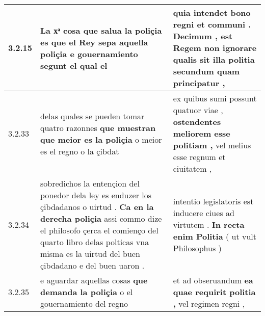 \begin{tabular}{|p{1cm}|p{6.5cm}|p{6.5cm}|}
3.2.15 & La xͣ cosa que salua la poliçia es \textbf{ que el Rey sepa aquella poliçia e gouernamiento } segunt el qual el & quia intendet bono regni et communi . \textbf{ Decimum , est Regem non ignorare qualis sit illa politia } secundum quam principatur , \\\hline
3.2.33 & delas quales se pueden tomar quatro razonnes \textbf{ que muestran que meior es la poliçia } o meior es el regno o la çibdat & ex quibus sumi possunt quatuor viae , \textbf{ ostendentes meliorem esse politiam , } vel melius esse regnum et ciuitatem , \\\hline
3.2.34 & sobredichos la entençion del ponedor dela ley es enduzer los çibdadanos o uirtud . \textbf{ Ca en la derecha poliçia } assi commo dize el philosofo çerca el comienço del quarto libro delas polticas vna misma es la uirtud del buen çibdadano e del buen uaron . & intentio legislatoris est inducere ciues ad virtutem . \textbf{ In recta enim Politia } ( ut vult Philosophus ) \\\hline
3.2.35 & e aguardar aquellas cosas \textbf{ que demanda la poliçia } o el gouernamiento del regno & et ad obseruandum \textbf{ ea quae requirit politia , } vel regimen regni , \\\hline

\end{tabular}
